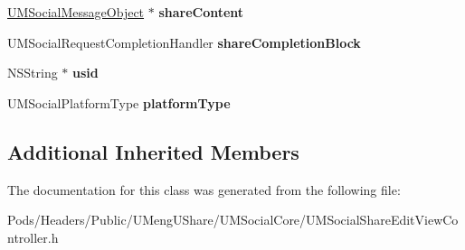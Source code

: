 \begin{DoxyCompactItemize}
\mbox{\hyperlink{interface_u_m_social_message_object}{U\+M\+Social\+Message\+Object}} $\ast$ {\bfseries share\+Content}
\item 
\mbox{\label{interface_u_m_social_share_edit_view_controller_ad67937ea391a95de5550f21a08577b3d}} 
U\+M\+Social\+Request\+Completion\+Handler {\bfseries share\+Completion\+Block}
\item 
\mbox{\label{interface_u_m_social_share_edit_view_controller_a7ea669e0f286207a8e7461966a8a19a2}} 
N\+S\+String $\ast$ {\bfseries usid}
\item 
\mbox{\label{interface_u_m_social_share_edit_view_controller_a9836f27aa8a4869aa98433c75f2ad011}} 
U\+M\+Social\+Platform\+Type {\bfseries platform\+Type}
\end{DoxyCompactItemize}
\subsection*{Additional Inherited Members}


The documentation for this class was generated from the following file\+:\begin{DoxyCompactItemize}
\item 
Pods/\+Headers/\+Public/\+U\+Meng\+U\+Share/\+U\+M\+Social\+Core/U\+M\+Social\+Share\+Edit\+View\+Controller.\+h\end{DoxyCompactItemize}
